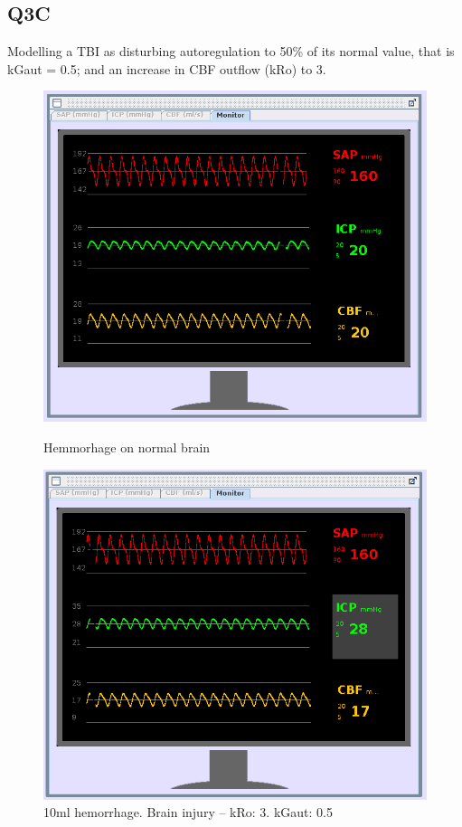\subsection*{Q3C}
Modelling a TBI as disturbing autoregulation to 50\% of its normal value, that is kGaut = 0.5; and an increase in CBF outflow (kRo) to 3.
\begin{figure}[h]
    \begin{minipage}{0.45\textwidth}
            \centering
            \includegraphics[width=\textwidth]{images/Q3C-Normal.png}
            \caption{Hemmorhage on normal brain}
    \end{minipage}
    \begin{minipage}{0.45\textwidth}
            \centering
            \includegraphics[width=\textwidth]{images/Q3C-TBI.png}
            \caption{10ml hemorrhage. Brain injury -- kRo: 3. kGaut: 0.5}
    \end{minipage}
\end{figure}

